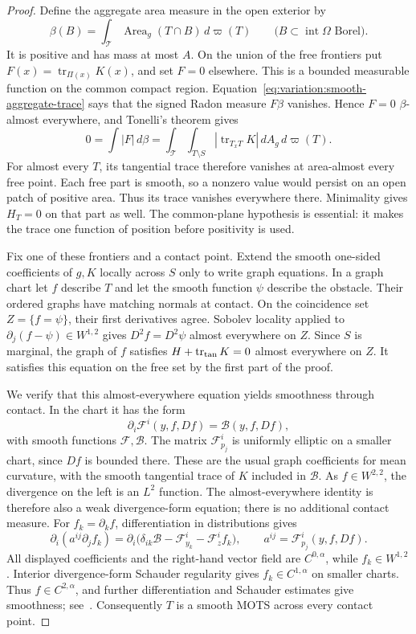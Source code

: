 \begin{proof}
Define the aggregate area measure in the open exterior by
\[
 \beta(B)=\int_{\mathcal T}\operatorname{Area}_g(T\cap B)\,d\varpi(T)
 \qquad\bigl(B\subset\operatorname{int}\Omega\text{ Borel}\bigr).
\]
It is positive and has mass at most $A$. On the union of the free
frontiers put $F(x)=\operatorname{tr}_{\Pi(x)}K(x)$, and set $F=0$
elsewhere. This is a bounded measurable function on the common compact
region. Equation~\eqref{eq:variation:smooth-aggregate-trace} says that
the signed Radon measure $F\beta$ vanishes. Hence $F=0$
$\beta$-almost everywhere, and Tonelli's theorem gives
\[
 0=\int |F|\,d\beta
  =\int_{\mathcal T}\int_{T\setminus S}
          |\operatorname{tr}_{T_xT}K|\,dA_g\,d\varpi(T).
\]
For almost every $T$, its tangential trace therefore vanishes at
area-almost every free point. Each free part is smooth, so a nonzero
value would persist on an open patch of positive area. Thus its trace
vanishes everywhere there. Minimality gives $H_T=0$ on that part as
well. The common-plane hypothesis is essential: it makes the trace one
function of position before positivity is used.

Fix one of these frontiers and a contact point. Extend the smooth
one-sided coefficients of $g,K$ locally across $S$ only to write graph
equations. In a graph chart let $f$ describe $T$ and let the smooth
function $\psi$ describe the obstacle. Their ordered graphs have
matching normals at contact. On the coincidence set $Z=\{f=\psi\}$,
their first derivatives agree. Sobolev locality applied to
$\partial_j(f-\psi)\in W^{1,2}$ gives
$D^2f=D^2\psi$ almost everywhere on $Z$. Since $S$ is marginal, the
graph of $f$ satisfies $H+\operatorname{tr}_{\rm tan}K=0$ almost
everywhere on $Z$. It satisfies this equation on the free set by the
first part of the proof.

We verify that this almost-everywhere equation yields smoothness
through contact. In the chart it has the form
\[
 \partial_i\mathcal F^i(y,f,Df)=\mathcal B(y,f,Df),
\]
with smooth functions $\mathcal F,\mathcal B$. The matrix
$\mathcal F^i_{p_j}$ is uniformly elliptic on a smaller chart, since
$Df$ is bounded there. These are the usual graph coefficients for
mean curvature, with the smooth tangential trace of $K$ included in
$\mathcal B$. As $f\in W^{2,2}$, the divergence on the left is an
$L^2$ function. The almost-everywhere identity is therefore also a
weak divergence-form equation; there is no additional contact measure.
For $f_k=\partial_k f$, differentiation in distributions gives
\[
 \partial_i(a^{ij}\partial_j f_k)
   =\partial_i\bigl(\delta_{ik}\mathcal B
           -\mathcal F^i_{y_k}-\mathcal F^i_z f_k\bigr),
 \qquad a^{ij}=\mathcal F^i_{p_j}(y,f,Df).
\]
All displayed coefficients and the right-hand vector field are
$C^{0,\alpha}$, while $f_k\in W^{1,2}$. Interior divergence-form
Schauder regularity gives $f_k\in C^{1,\alpha}$ on smaller charts.
Thus $f\in C^{2,\alpha}$, and further differentiation and Schauder
estimates give smoothness; see~\cite{GilbargTrudinger2001}.
Consequently $T$ is a smooth MOTS across every contact point.


\end{proof}
